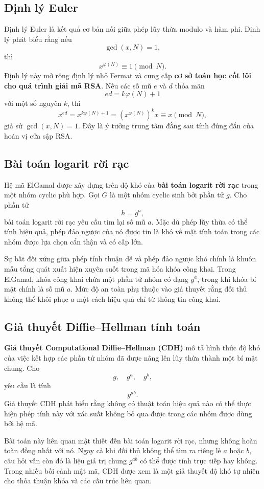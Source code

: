 \subsection{Định lý Euler}

Định lý Euler là kết quả cơ bản nối giữa phép lũy thừa modulo và hàm phi. Định lý phát biểu rằng nếu
\[
\gcd(x,N) = 1,
\]
thì
\[
x^{\varphi(N)} \equiv 1 \pmod{N}.
\]
Định lý này mở rộng định lý nhỏ Fermat và cung cấp \textbf{cơ sở toán học cốt lõi cho quá trình giải mã RSA}. Nếu các số mũ $e$ và $d$ thỏa mãn
\[
ed = k\varphi(N) + 1
\]
với một số nguyên $k$, thì
\[
x^{ed} = x^{k\varphi(N)+1} = \left(x^{\varphi(N)}\right)^k x \equiv x \pmod{N},
\]
giả sử $\gcd(x,N)=1$. Đây là ý tưởng trung tâm đằng sau tính đúng đắn của hoán vị cửa sập RSA.

\subsection{Bài toán logarit rời rạc}

Hệ mã ElGamal được xây dựng trên độ khó của \textbf{bài toán logarit rời rạc} trong một nhóm cyclic phù hợp. Gọi $G$ là một nhóm cyclic sinh bởi phần tử $g$. Cho phần tử
\[
h = g^a,
\]
bài toán logarit rời rạc yêu cầu tìm lại số mũ $a$. Mặc dù phép lũy thừa có thể tính hiệu quả, phép đảo ngược của nó được tin là khó về mặt tính toán trong các nhóm được lựa chọn cẩn thận và có cấp lớn.

Sự bất đối xứng giữa phép tính thuận dễ và phép đảo ngược khó chính là khuôn mẫu tổng quát xuất hiện xuyên suốt trong mã hóa khóa công khai. Trong ElGamal, khóa công khai chứa một phần tử nhóm có dạng $g^a$, trong khi khóa bí mật chính là số mũ $a$. Mức độ an toàn phụ thuộc vào giả thuyết rằng đối thủ không thể khôi phục $a$ một cách hiệu quả chỉ từ thông tin công khai.

\subsection{Giả thuyết Diffie--Hellman tính toán}

\textbf{Giả thuyết Computational Diffie--Hellman (CDH)} mô tả hình thức độ khó của việc kết hợp các phần tử nhóm đã được nâng lên lũy thừa thành một bí mật chung. Cho
\[
g, \quad g^a, \quad g^b,
\]
yêu cầu là tính
\[
g^{ab}.
\]
Giả thuyết CDH phát biểu rằng không có thuật toán hiệu quả nào có thể thực hiện phép tính này với xác suất không bỏ qua được trong các nhóm được dùng bởi hệ mã.

Bài toán này liên quan mật thiết đến bài toán logarit rời rạc, nhưng không hoàn toàn đồng nhất với nó. Ngay cả khi đối thủ không thể tìm ra riêng lẻ $a$ hoặc $b$, câu hỏi vẫn còn đó là liệu giá trị chung $g^{ab}$ có thể được tính trực tiếp hay không. Trong nhiều bối cảnh mật mã, CDH được xem là một giả thuyết độ khó tự nhiên cho thỏa thuận khóa và các cấu trúc liên quan.

